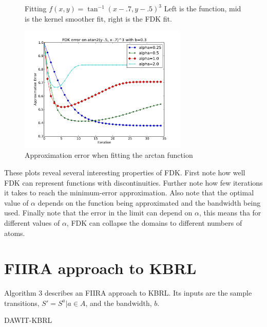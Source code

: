 \begin{figure}[!htb]
  \endminipage
\caption[Fitting the arctan]{Fitting $f(x,y) = \tan^{-1}(x - .7, y - .5)^3$
Left is the function, mid is the kernel smoother fit, right is the FDK fit.}
\end{figure}

\begin{figure}[!!!ht]
  \centering
    \includegraphics[width=80mm]{figs/chap4/atanerr.pdf}
  \caption{Approximation error when fitting the arctan function}
\end{figure}

These plots reveal several interesting properties of FDK.
First note how well FDK can represent functions with discontinuities.
Further note how few iterations it takes to reach the minimum-error
approximation.
Also note that the optimal value of $\alpha$ depends on the function being
approximated and the bandwidth being used.
Finally note that the error in the limit can depend on $\alpha$, this
means tha for different values of $\alpha$, FDK can collapse the domains to
different numbers of atoms.

\section{FIIRA approach to KBRL}
Algorithm 3 describes an FIIRA approach to KBRL.
Its inputs are the sample transitions, $S' = {S^a | a \in A}$, and
the bandwidth, $b$.

\begin{algorithm}
\caption{DAWIT-KBRL}\label{dkbrl}
\end{algorithm}

